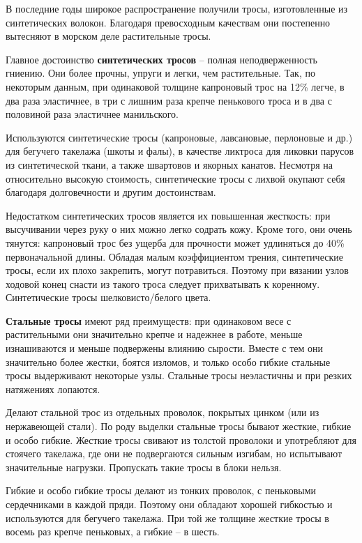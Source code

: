 \documentclass[a4paper, 12pt, twoside, final]{scrbook}
\begin{document}
В последние годы широкое распространение получили тросы, изготовленные из синтетических волокон. Благодаря превосходным качествам они постепенно вытесняют в морском деле растительные тросы.

Главное достоинство \textbf{синтетических тросов} \--- полная неподверженность гниению. Они более прочны, упруги и легки, чем растительные. Так, по некоторым данным, при одинаковой толщине капроновый трос на 12\% легче, в два раза эластичнее, в три с лишним раза крепче пенькового троса и в два с половиной раза эластичнее манильского.

Используются синтетические тросы (капроновые, лавсановые, перлоновые и др.) для бегучего такелажа (шкоты и фалы), в качестве ликтроса для ликовки парусов из синтетической ткани, а также швартовов и якорных канатов. Несмотря на относительно высокую стоимость, синтетические тросы с лихвой окупают себя благодаря долговечности и другим достоинствам.

Недостатком синтетических тросов является их повышенная жесткость: при высучивании через руку о них можно легко содрать кожу. Кроме того, они очень тянутся: капроновый трос без ущерба для прочности может удлиняться до 40\% первоначальной длины. Обладая малым коэффициентом трения, синтетические тросы, если их плохо закрепить, могут потравиться. Поэтому при вязании узлов ходовой конец снасти из такого троса следует прихватывать к коренному. Синтетические тросы шелковисто\-/белого цвета.

\textbf{Стальные тросы} имеют ряд преимуществ: при одинаковом весе с растительными они значительно крепче и надежнее в работе, меньше изнашиваются и меньше подвержены влиянию сырости. Вместе с тем они значительно более жестки, боятся изломов, и только особо гибкие стальные тросы выдерживают некоторые узлы. Стальные тросы неэластичны и при резких натяжениях лопаются.

Делают стальной трос из отдельных проволок, покрытых цинком (или из нержавеющей стали). По роду выделки стальные тросы бывают жесткие, гибкие и особо гибкие. Жесткие тросы свивают из толстой проволоки и употребляют для стоячего такелажа, где они не подвергаются сильным изгибам, но испытывают значительные нагрузки. Пропускать такие тросы в блоки нельзя.

Гибкие и особо гибкие тросы делают из тонких проволок, с пеньковыми сердечниками в каждой пряди. Поэтому они обладают хорошей гибкостью и используются для бегучего такелажа. При той же толщине жесткие тросы в восемь раз крепче пеньковых, а гибкие \--- в шесть.
\end{document}

